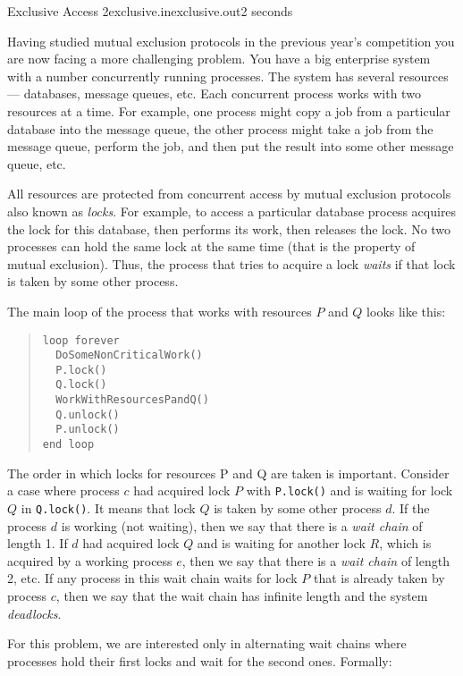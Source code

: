 \begin{problem}{Exclusive Access 2}{exclusive.in}{exclusive.out}{2 seconds}


Having studied mutual exclusion protocols in the previous year's competition you are
now facing a more challenging problem. You have a big enterprise system with a number
concurrently running processes. The system has several resources --- databases, message queues, etc.
Each concurrent process works with two resources at a time. For example, one process might 
copy a job from a particular database into the message queue, the other process might take a job from 
the message queue, perform the job, and then put the result into some other message queue, etc.

All resources are protected from concurrent access by mutual exclusion protocols also known as \emph{locks}. 
For example, to access a particular database process acquires the lock for this
database, then performs its work, then releases the lock. No two processes can hold the same lock
at the same time (that is the property of mutual exclusion). Thus, the process that tries to
acquire a lock \emph{waits} if that lock is taken by some other process.

The main loop of the process that works with resources $P$ and $Q$ looks like this:

\begin{quote}
\begin{verbatim}
loop forever
  DoSomeNonCriticalWork()
  P.lock()
  Q.lock()
  WorkWithResourcesPandQ()
  Q.unlock()
  P.unlock()
end loop
\end{verbatim}
\end{quote}

The order in which locks for resources P and Q are taken is important. Consider a case where process $c$
had acquired lock $P$ with \texttt{P.lock()} and is waiting for lock $Q$ in \texttt{Q.lock()}. 
It means that lock $Q$ is taken by some other 
process $d$. If the process $d$ is working (not waiting), then we say that there is a \emph{wait chain} of
length 1. If $d$ had acquired lock $Q$ and is waiting for another lock $R$, which is acquired by a working process $e$,
then we say that there is a \emph{wait chain} of length 2, etc. If any process in this wait chain waits for
lock $P$ that is already taken by process $c$, then we say that the wait chain has infinite length and the system 
\emph{deadlocks}. 

For this problem, we are interested only in alternating wait chains where processes hold their 
first locks and wait for the second ones. Formally:


\end{problem}
